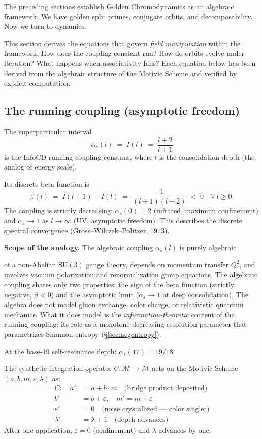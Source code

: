 The preceding sections establish Golden Chromodynamics as an algebraic framework. We have golden split primes, conjugate orbits, and decomposability. Now we turn to dynamics.

This section derives the equations that govern \emph{field manipulation} within the framework. How does the coupling constant run? How do orbits evolve under iteration? What happens when associativity fails? Each equation below has been derived from the algebraic structure of the Motivic Scheme and verified by explicit computation.

\subsection{The running coupling (asymptotic freedom)}

The superparticular interval
\[
\alpha_s(l) \;=\; I(l) \;=\; \frac{l + 2}{l + 1}
\]
is the InfoCD running coupling constant, where $l$ is the
consolidation depth (the analog of energy scale).

Its discrete beta function is
\[
\beta(l) \;=\; I(l+1) - I(l) \;=\; \frac{-1}{(l+1)(l+2)} \;<\; 0
\quad \forall\, l \geq 0.
\]
The coupling is strictly decreasing: $\alpha_s(0) = 2$ (infrared,
maximum confinement) and $\alpha_s \to 1$ as $l \to \infty$ (UV,
asymptotic freedom). This describes the discrete spectral convergence
(Gross--Wilczek--Politzer, 1973).

\textbf{Scope of the analogy.} The algebraic coupling $\alpha_s(l)$
is purely algebraic

of a non-Abelian $\mathrm{SU}(3)$ gauge theory, depends on momentum
transfer $Q^2$, and involves vacuum polarization and renormalization
group equations. The algebraic coupling shares only two properties:
the sign of the beta function (strictly negative, $\beta < 0$) and
the asymptotic limit ($\alpha_s \to 1$ at deep consolidation). The
algebra does not model gluon exchange, color charge, or relativistic
quantum mechanics. What it does model is the \emph{information-theoretic}
content of the running coupling: its role as a monotone decreasing
resolution parameter that parametrizes Shannon entropy
(\S\ref{sec:negentropy}).

At the base-19 self-resonance depth: $\alpha_s(17) = 19/18$.

The synthetic integration operator $C : \mathcal{M} \to \mathcal{M}$
acts on the Motivic Scheme $(a, b, m, \varepsilon, \lambda)$ as:
\begin{align}
C: \quad
a' &= a + b \cdot m \quad \text{(bridge product deposited)} \\
b' &= b + \varepsilon, \quad m' = m + \varepsilon \\
\varepsilon' &= 0 \quad \text{(noise crystallized --- color singlet)} \\
\lambda' &= \lambda + 1 \quad \text{(depth advances)}
\end{align}
After one application, $\varepsilon = 0$ (confinement) and
$\lambda$ advances by one.

